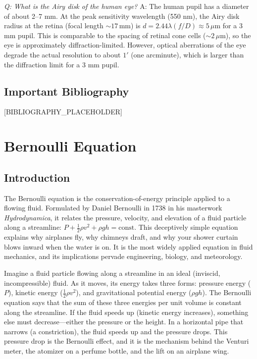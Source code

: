 \documentclass[11pt,openright]{book}
\begin{document}
\textit{Q: What is the Airy disk of the human eye?}
A: The human pupil has a diameter of about 2--7 mm. At the peak sensitivity wavelength (550 nm), the Airy disk radius at the retina (focal length $\sim 17\,\text{mm}$) is $d = 2.44\lambda(f/D) \approx 5\,\mu\text{m}$ for a 3 mm pupil. This is comparable to the spacing of retinal cone cells ($\sim 2\,\mu\text{m}$), so the eye is approximately diffraction-limited. However, optical aberrations of the eye degrade the actual resolution to about $1'$ (one arcminute), which is larger than the diffraction limit for a 3 mm pupil.
\section*{Important Bibliography}

[BIBLIOGRAPHY_PLACEHOLDER]


\chapter{Bernoulli Equation}

\section*{Introduction}

The Bernoulli equation is the conservation-of-energy principle applied to a flowing fluid. Formulated by Daniel Bernoulli in 1738 in his masterwork \textit{Hydrodynamica}, it relates the pressure, velocity, and elevation of a fluid particle along a streamline: $P + \frac{1}{2}\rho v^2 + \rho gh = \text{const}$. This deceptively simple equation explains why airplanes fly, why chimneys draft, and why your shower curtain blows inward when the water is on. It is the most widely applied equation in fluid mechanics, and its implications pervade engineering, biology, and meteorology.

Imagine a fluid particle flowing along a streamline in an ideal (inviscid, incompressible) fluid. As it moves, its energy takes three forms: pressure energy ($P$), kinetic energy ($\frac{1}{2}\rho v^2$), and gravitational potential energy ($\rho gh$). The Bernoulli equation says that the sum of these three energies per unit volume is constant along the streamline. If the fluid speeds up (kinetic energy increases), something else must decrease---either the pressure or the height. In a horizontal pipe that narrows (a constriction), the fluid speeds up and the pressure drops. This pressure drop is the Bernoulli effect, and it is the mechanism behind the Venturi meter, the atomizer on a perfume bottle, and the lift on an airplane wing.
\end{document}
